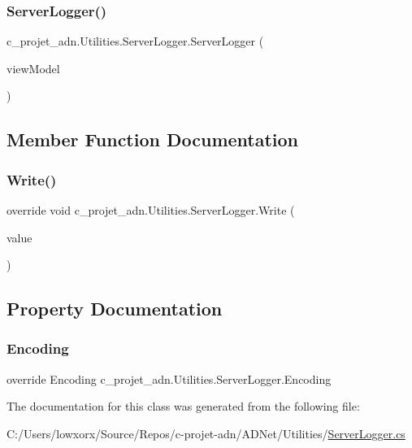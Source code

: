 \subsubsection{\texorpdfstring{Server\+Logger()}{ServerLogger()}}
{\footnotesize\ttfamily c\+\_\+projet\+\_\+adn.\+Utilities.\+Server\+Logger.\+Server\+Logger (\begin{DoxyParamCaption}\item[{V\+M\+Orch\+View}]{view\+Model }\end{DoxyParamCaption})}



\subsection{Member Function Documentation}
\mbox{\label{classc__projet__adn_1_1_utilities_1_1_server_logger_a1d8c27ad0c90a8e378d8ffaeb462aced}} 
\subsubsection{\texorpdfstring{Write()}{Write()}}
{\footnotesize\ttfamily override void c\+\_\+projet\+\_\+adn.\+Utilities.\+Server\+Logger.\+Write (\begin{DoxyParamCaption}\item[{char}]{value }\end{DoxyParamCaption})}



\subsection{Property Documentation}
\mbox{\label{classc__projet__adn_1_1_utilities_1_1_server_logger_a2637e6fbbb9b784ffb3e33c1240d2e02}} 
\subsubsection{\texorpdfstring{Encoding}{Encoding}}
{\footnotesize\ttfamily override Encoding c\+\_\+projet\+\_\+adn.\+Utilities.\+Server\+Logger.\+Encoding\hspace{0.3cm}{\ttfamily [get]}}



The documentation for this class was generated from the following file\+:\begin{DoxyCompactItemize}
\item 
C\+:/\+Users/lowxorx/\+Source/\+Repos/c-\/projet-\/adn/\+A\+D\+Net/\+Utilities/\hyperlink{_server_logger_8cs}{Server\+Logger.\+cs}\end{DoxyCompactItemize}
